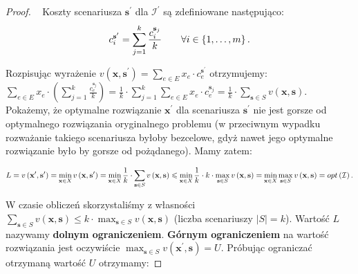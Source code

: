 \begin{proof}~\cite[$430$]{minmaxSurvey}
	Koszty scenariusza $\textbf{s}^{\prime}$ dla $\mathcal{I}^{\prime}$ są zdefiniowane następująco:
	\begin{equation}
		c^{\textbf{s}^{\prime}}_{i} = \sum_{\mathclap{j = 1}}^{k} \frac{c_{i}^{\textbf{s}_{j}}}{k} \qquad \forall i \in \left\{ 1, \dots, m \right\}\text{.}
	\end{equation}
	
	Rozpisując wyrażenie $v \left( \textbf{x}, \textbf{s}^{\prime} \right) = \sum_{e \in E} x_{e} \cdot c^{\textbf{s}^{\prime}}_{e}$ otrzymujemy: $\sum_{e \in E} x_{e} \cdot \left( \sum_{j = 1}^{k} \frac{c_{e}^{\textbf{s}_{j}}}{k} \right) = \frac{1}{k} \cdot \sum_{j = 1}^{k} \sum_{e \in E} x_{e} \cdot c^{\textbf{s}_{j}}_{e} = \frac{1}{k} \cdot \sum_{\textbf{s} \in S} v \left( \textbf{x}, \textbf{s} \right)$. Pokażemy, że optymalne rozwiązanie $\textbf{x}^{\prime}$ dla scenariusza $\textbf{s}^{\prime}$ nie jest gorsze od optymalnego rozwiązania oryginalnego problemu (w przeciwnym wypadku rozważanie takiego scenariusza byłoby bezcelowe, gdyż nawet jego optymalne rozwiązanie było by gorsze od pożądanego). Mamy zatem:
	
	\begin{equation}
		L = v \left( \textbf{x}^{\prime}, \textbf{s}^{\prime} \right) = \min_{\mathclap{\textbf{x} \in X}} v \left( \textbf{x}, \textbf{s}^{\prime} \right) = \min_{ \mathclap{\textbf{x} \in X}} \frac{1}{k} \cdot \sum_{\textbf{s} \in S} v \left( \textbf{x}, \textbf{s} \right) \leqslant \min_{ \mathclap{\textbf{x} \in X}} \frac{1}{k} \cdot k \cdot \max_{\textbf{s} \in S} v \left( \textbf{x}, \textbf{s} \right) = \min_{ \mathclap{\textbf{x} \in X}} \max_{\textbf{s} \in S} v \left( \textbf{x}, \textbf{s} \right) = opt \left( \mathcal{I}\right)\text{.}
	\end{equation}
	
	W czasie obliczeń skorzystaliśmy z własności $\sum_{\textbf{s} \in S} v \left( \textbf{x}, \textbf{s} \right) \leqslant k \cdot \max_{\textbf{s} \in S} v \left( \textbf{x}, \textbf{s} \right)$ (liczba scenariuszy $\left| S \right| = k$). Wartość $L$ nazywamy \textbf{dolnym ograniczeniem}. \textbf{Górnym ograniczeniem} na wartość rozwiązania jest oczywiście $\max_{\textbf{s} \in S} v \left( \textbf{x}^{\prime}, \textbf{s} \right) = U$. Próbując ograniczać otrzymaną wartość $U$ otrzymamy:
	

\end{proof}
